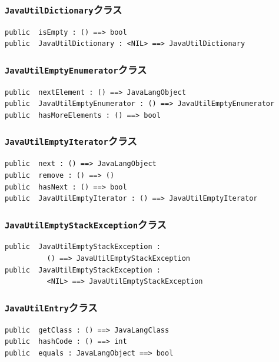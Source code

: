 \documentclass[\pformat,12pt]{jarticle}
\begin{document}
\subsubsection{\texttt{JavaUtilDictionary}クラス}
\begin{small}
\begin{verbatim}
public  isEmpty : () ==> bool
public  JavaUtilDictionary : <NIL> ==> JavaUtilDictionary
\end{verbatim}
\end{small}

\subsubsection{\texttt{JavaUtilEmptyEnumerator}クラス}
\begin{small}
\begin{verbatim}
public  nextElement : () ==> JavaLangObject
public  JavaUtilEmptyEnumerator : () ==> JavaUtilEmptyEnumerator
public  hasMoreElements : () ==> bool
\end{verbatim}
\end{small}

\subsubsection{\texttt{JavaUtilEmptyIterator}クラス}
\begin{small}
\begin{verbatim}
public  next : () ==> JavaLangObject
public  remove : () ==> ()
public  hasNext : () ==> bool
public  JavaUtilEmptyIterator : () ==> JavaUtilEmptyIterator
\end{verbatim}
\end{small}

\subsubsection{\texttt{JavaUtilEmptyStackException}クラス}
\begin{small}
\begin{verbatim}
public  JavaUtilEmptyStackException : 
          () ==> JavaUtilEmptyStackException
public  JavaUtilEmptyStackException : 
          <NIL> ==> JavaUtilEmptyStackException
\end{verbatim}
\end{small}

\subsubsection{\texttt{JavaUtilEntry}クラス}
\begin{small}
\begin{verbatim}
public  getClass : () ==> JavaLangClass
public  hashCode : () ==> int
public  equals : JavaLangObject ==> bool
\end{verbatim}
\end{small}
\end{document}
